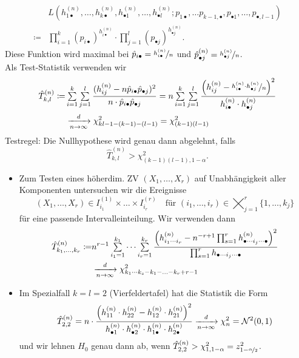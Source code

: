 \documentclass{cheat-sheet}
\newcommand{\Normal}{\mathcal{N}} %
\begin{document}
\begin{verf}
  \begin{align*}
    & L(h_{1 \bullet}^{(n)}, \ldots, h_{k \bullet}^{(n)}, h_{\bullet 1}^{(n)}, \ldots, h_{\bullet l}^{(n)}; p_{1 \bullet}, \ldots p_{k-1, \bullet}, p_{\bullet 1}, \ldots, p_{\bullet, l-1}) \\
    \coloneqq & \prod_{i=1}^{k} (p_{i \bullet})^{h_{i \bullet}^{(n)}} \cdot \prod_{j=1}^l (p_{\bullet j})^{h_{\bullet j}^{(n)}}.
  \end{align*}
  Diese Funktion wird maximal bei $\hat{p}_{i \bullet} = \nicefrac{h_{i \bullet}^{(n)}}{n}$ und $\hat{p}_{\bullet j}^{(n)} = \nicefrac{h_{\bullet j}^{(n)}}{n}$. \\
  Als Test-Statistik verwenden wir
  \begin{align*}
    \hat{T}_{k,l}^{(n)} \coloneqq &
    \sum_{i=1}^k \sum_{j=1}^l \frac{(h_{ij}^{(n)} - n \hat{p}_{i \bullet} \hat{p}_{\bullet j})^2}{n \cdot \hat{p}_{i \bullet} \hat{p}_{\bullet j}} =
    n \sum_{i=1}^k \sum_{j=1}^l \frac{\left( h_{ij}^{(n)} - \nicefrac{h_{i \bullet}^{(n)} \cdot h_{\bullet j}^{(n)}}{n} \right)^2}{h_{i \bullet}^{(n)} \cdot h_{\bullet j}^{(n)}} \\
    & \xra[n \to \infty]{d} \chi^2_{kl - 1 - (k{-}1) - (l{-}1)} = \chi^2_{(k-1)(l-1)}
  \end{align*}
  Testregel: Die Nullhypothese wird genau dann abgelehnt, falls
  \[ \hat{T}_{k,l}^{(n)} > \chi^2_{(k-1)(l-1),1-\alpha}. \]
\end{verf}

\begin{bemn}
  \begin{itemize}
    \item Zum Testen eines höherdim. ZV $(X_1, \ldots, X_r)$ auf Unabhängigkeit aller Komponenten untersuchen wir die Ereignisse
    \[
      (X_1, \ldots, X_r) \in I_{i_1}^{(1)} \times \ldots \times I_{i_r}^{(r)} \quad
      \text{für $(i_1, \ldots, i_r) \in \bigtimes_{j=1}^r \{ 1, \ldots, k_j \}$}
    \]
    für eine passende Intervalleinteilung.
    Wir verwenden dann
    \begin{align*}
      \hat{T}_{k_1, \ldots, k_r}^{(n)} \coloneqq
      & n^{r-1} \sum_{i_1=1}^{k_1} \cdots \sum_{i_r=1}^{k_r} \frac{\left(h_{i_1 \cdots i_r}^{(n)} - n^{-r + 1} \prod_{s=1}^r h_{\bullet \cdots i_j \cdots \bullet}^{(n)}\right)^2}{\prod_{s=1}^r h_{\bullet \cdots i_j \cdots \bullet}} \\
      & \xra[n \to \infty]{d} \chi^2_{k_1 \cdots k_s - k_1 - \ldots - k_r + r - 1}
    \end{align*}
    \item Im Spezialfall $k \!=\! l \!=\! 2$ (Vierfeldertafel) hat die Statistik die Form
    \[
      \hat{T}_{2,2}^{(n)} =
      n \cdot \frac{\left(h_{11}^{(n)} \cdot h_{22}^{(n)} - h_{12}^{(n)} \cdot h_{21}^{(n)}\right)^2}{h_{\bullet 1}^{(n)} \cdot h_{\bullet 2}^{(n)} \cdot h_{1 \bullet}^{(n)} \cdot h_{2 \bullet}^{(n)}}
      \xra[n \to \infty]{d} \chi^2_n = \Normal^2(0, 1)
    \]
    und wir lehnen $H_0$ genau dann ab, wenn $\hat{T}_{2,2}^{(n)} > \chi^2_{1,1-\alpha} = z^2_{1 - \nicefrac{\alpha}{2}}$.
  \end{itemize}
\end{bemn}
\end{document}
